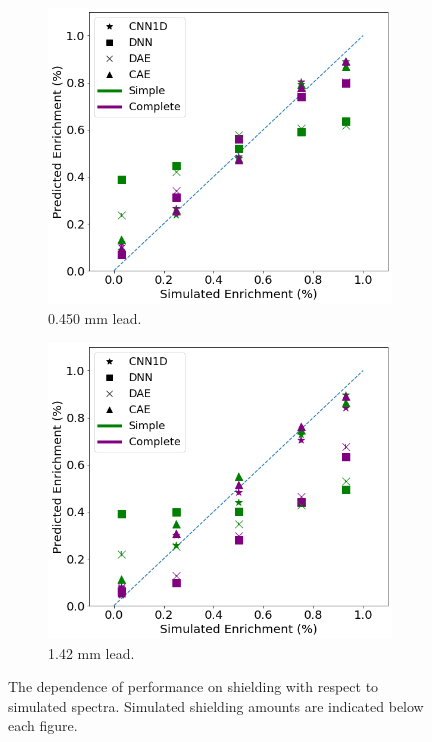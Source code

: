 \begin{figure}[H]
     \begin{subfigure}[b]{0.49\textwidth}
         \centering
         \includegraphics[width=\textwidth]{images/simuranium-mediumlead.png}
         \caption{0.450 mm lead.}
         \label{fig:simuranium-mediumlead}
     \end{subfigure}
     \hfill
     \begin{subfigure}[b]{0.49\textwidth}
         \centering
         \includegraphics[width=\textwidth]{images/simuranium-heavylead.png}
         \caption{1.42 mm lead.}
         \label{fig:simuranium-heavylead}
     \end{subfigure}
        \caption{The dependence of performance on shielding with respect to simulated spectra. Simulated shielding amounts are indicated below each figure.}
        \label{fig:simuranium-shielding}
\end{figure}




